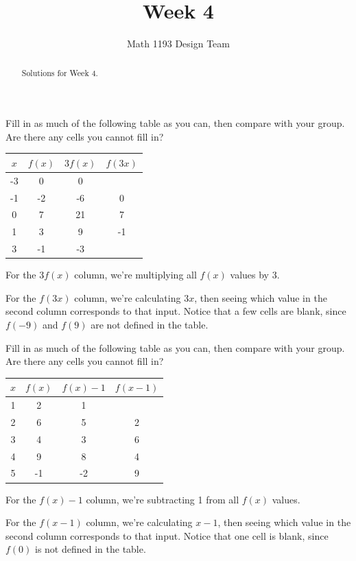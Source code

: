 \documentclass[noauthor]{ximera}
\title{Week 4}
\author{Math 1193 Design Team}
\begin{document}
\begin{abstract}
    Solutions for Week 4.
\end{abstract}
\maketitle

\begin{problem}
Fill in as much of the following table as you can, then 
compare with your group. Are there any cells you cannot fill in?

\begin{center}
\begin{tabular}{|c|c|c|c|} 
 \hline
 \(x\) & \(f(x)\) & \(3f(x)\) & \(f(3x)\) \\
 \hline\hline
 -3 & 0 & 0 &  \\ 
 \hline
 -1 & -2 & -6 & 0 \\
 \hline
 0 & 7 & 21 & 7 \\
 \hline
 1 & 3 & 9 & -1 \\
 \hline
 3 & -1 & -3 &  \\
 \hline
\end{tabular}
\end{center}

\begin{explanation}
For the \(3f(x)\) column, we're multiplying all \(f(x)\) values by 3.

For the \(f(3x)\) column, we're calculating \(3x\), then seeing which value in the second column corresponds to that input. Notice that a few cells are blank,
since \(f(-9)\) and \(f(9)\) are not defined in the table.
\end{explanation}
\end{problem}

\begin{problem}
Fill in as much of the following table as you can, then 
compare with your group. Are there any cells you cannot fill in?

\begin{center}
\begin{tabular}{|c|c|c|c|} 
 \hline
 \(x\) & \(f(x)\) & \(f(x)-1\) & \(f(x - 1)\) \\
 \hline\hline
 1 & 2 & 1 &  \\ 
 \hline
 2 & 6 & 5 & 2 \\
 \hline
 3 & 4 & 3 & 6 \\
 \hline
 4 & 9 & 8 & 4 \\
 \hline
 5 & -1 & -2 & 9 \\
 \hline
\end{tabular}
\end{center}

\begin{explanation}
    For the \(f(x)-1\) column, we're subtracting 1 from all \(f(x)\) values.

For the \(f(x - 1)\) column, we're calculating \(x - 1\), then seeing which value in the second column corresponds to that input. Notice that one cell
is blank, since \(f(0)\) is not defined in the table.
\end{explanation}
\end{problem}
\end{document}
